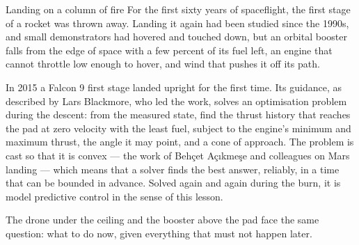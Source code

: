 \begin{curiosity}{Landing on a column of fire}
For the first sixty years of spaceflight, the first stage of a rocket was thrown away. Landing it again had been studied since the 1990s, and small demonstrators had hovered and touched down, but an orbital booster falls from the edge of space with a few percent of its fuel left, an engine that cannot throttle low enough to hover, and wind that pushes it off its path.

In 2015 a Falcon 9 first stage landed upright for the first time. Its guidance, as described by Lars Blackmore, who led the work, solves an optimisation problem during the descent: from the measured state, find the thrust history that reaches the pad at zero velocity with the least fuel, subject to the engine's minimum and maximum thrust, the angle it may point, and a cone of approach. The problem is cast so that it is convex — the work of Behçet Açıkmeşe and colleagues on Mars landing — which means that a solver finds the best answer, reliably, in a time that can be bounded in advance. Solved again and again during the burn, it is model predictive control in the sense of this lesson.

The drone under the ceiling and the booster above the pad face the same question: what to do now, given everything that must not happen later.
\end{curiosity}

